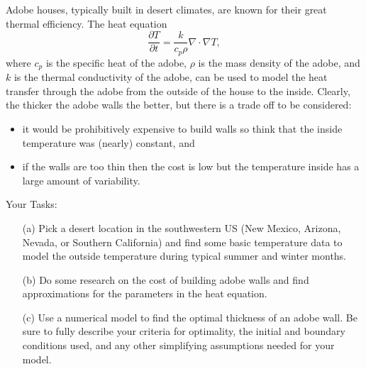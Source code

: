 \begin{problem}
    Adobe houses, typically built in desert climates, are known for their great thermal
    efficiency.  The heat equation 
    \[ \frac{\partial T}{\partial t} = \frac{k}{c_p \rho} \nabla \cdot \nabla T, \]
    where $c_p$ is the specific heat of the adobe, $\rho$ is the mass density of the
    adobe, and $k$ is the thermal conductivity of the adobe, can be used to model the heat
    transfer through the adobe from the outside of the house to the inside.  Clearly, the
    thicker the adobe walls the better, but there is a trade off to be considered: 
    \begin{itemize}
        \item it would be prohibitively expensive to build walls so think that the inside
            temperature was (nearly) constant, and 
        \item if the walls are too thin then the cost is low but the temperature inside
            has a large amount of variability.  
    \end{itemize}
    Your Tasks:
    \begin{enumerate}
        \item[(a)] Pick a desert location in the southwestern US (New Mexico, Arizona, Nevada, or
            Southern California) and find some basic temperature data to model the outside
            temperature during typical summer and winter months.
        \item[(b)] Do some research on the cost of building adobe walls and find approximations for the
            parameters in the heat equation.
        \item[(c)] Use a numerical model to find the optimal thickness of an adobe wall.
            Be sure to fully describe your criteria for optimality, the initial and
            boundary conditions used, and any other simplifying assumptions needed for your model.
    \end{enumerate}
\end{problem}
